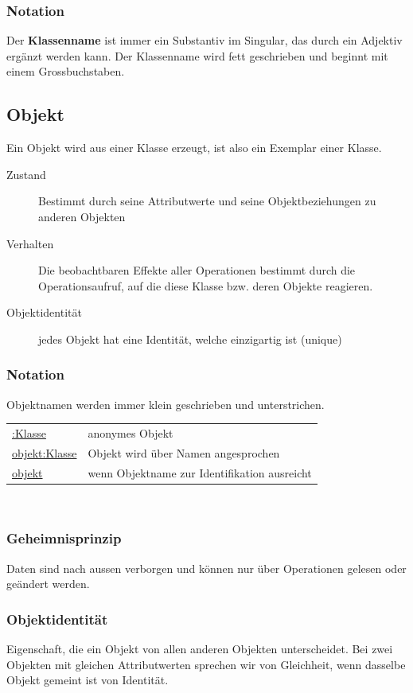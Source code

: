   \subsubsection{Notation}
  		Der \textbf{Klassenname} ist immer ein Substantiv im Singular, das durch ein Adjektiv
  		ergänzt werden kann. Der Klassenname wird fett geschrieben und beginnt mit einem
  		Grossbuchstaben. \\
  
\subsection{Objekt }
	Ein Objekt wird aus einer Klasse erzeugt, ist also ein Exemplar einer Klasse.
	\begin{description}
		\item[Zustand] 
      Bestimmt durch seine Attributwerte und seine Objektbeziehungen zu anderen Objekten
		\item[Verhalten] 
      Die beobachtbaren Effekte aller Operationen bestimmt durch die Operationsaufruf, 
      auf die diese Klasse bzw. deren Objekte reagieren.
		\item[Objektidentität] 
      jedes Objekt hat eine Identität, welche einzigartig ist (unique)
	\end{description}
	
	\subsubsection{Notation}
			Objektnamen werden immer klein geschrieben und unterstrichen. \\
		\begin{tabular}{l l}
			\underline{:Klasse} & anonymes Objekt \\
			\underline{objekt:Klasse} & Objekt wird über Namen angesprochen \\
			\underline{objekt} & wenn Objektname zur Identifikation ausreicht \\
		\end{tabular}\\
		
	\begin{multicols}{2}	
		\subsubsection{Geheimnisprinzip}
		Daten sind nach aussen verborgen und können nur über Operationen gelesen oder geändert werden.\\
		\subsubsection{Objektidentität}
		Eigenschaft, die ein Objekt von allen anderen Objekten unterscheidet. Bei zwei Objekten
		mit gleichen Attributwerten sprechen wir von Gleichheit, wenn dasselbe Objekt gemeint
		ist von Identität.
	\end{multicols}
	

